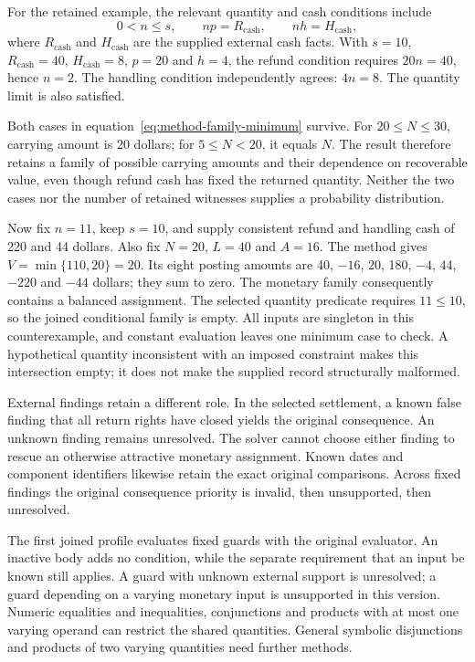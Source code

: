 For the retained example, the relevant quantity and cash conditions include
\begin{equation}
\label{eq:method-family-selected-conditions}
 0<n\leq s,\qquad np=R_{\mathrm{cash}},\qquad
 nh=H_{\mathrm{cash}},
\end{equation}
where \(R_{\mathrm{cash}}\) and \(H_{\mathrm{cash}}\) are the supplied
external cash facts. With \(s=10\), \(R_{\mathrm{cash}}=40\),
\(H_{\mathrm{cash}}=8\), \(p=20\) and \(h=4\), the refund condition
requires \(20n=40\), hence \(n=2\). The handling condition independently
agrees: \(4n=8\). The quantity limit is also satisfied.

Both cases in equation~\eqref{eq:method-family-minimum} survive. For
\(20\leq N\leq30\), carrying amount is 20 dollars; for
\(5\leq N<20\), it equals \(N\). The result therefore retains a family
of possible carrying amounts and their dependence on recoverable value, even
though refund cash has fixed the returned quantity. Neither the two cases nor
the number of retained witnesses supplies a probability distribution.

Now fix \(n=11\), keep \(s=10\), and supply consistent refund and handling
cash of 220 and 44 dollars. Also fix \(N=20\), \(L=40\) and \(A=16\).
The method gives \(V=\min\{110,20\}=20\). Its eight posting amounts are
40, \(-16\), 20, 180, \(-4\), 44, \(-220\) and \(-44\) dollars;
they sum to zero. The monetary family consequently contains a balanced
assignment. The selected quantity predicate requires \(11\leq10\), so
the joined conditional family is empty. All inputs are singleton in this
counterexample, and constant evaluation leaves one minimum case to check.
A hypothetical quantity inconsistent with an imposed constraint makes this
intersection empty; it does not make the supplied record structurally malformed.

External findings retain a different role. In the selected settlement, a known
false finding that all return rights have closed yields the original
 consequence. An unknown finding remains unresolved.
The solver cannot choose either finding to rescue an otherwise attractive
monetary assignment. Known dates and component identifiers likewise retain
the exact original comparisons. Across fixed findings the original consequence
priority is invalid, then unsupported, then unresolved.

The first joined profile evaluates fixed guards with the original evaluator.
An inactive body adds no condition, while the separate requirement that an
input be known still applies. A guard with unknown external support is
unresolved; a guard depending on a varying monetary input is unsupported in
this version. Numeric equalities and inequalities, conjunctions and products
with at most one varying operand can restrict the shared quantities.
General symbolic disjunctions and products of two varying quantities need
further methods.


